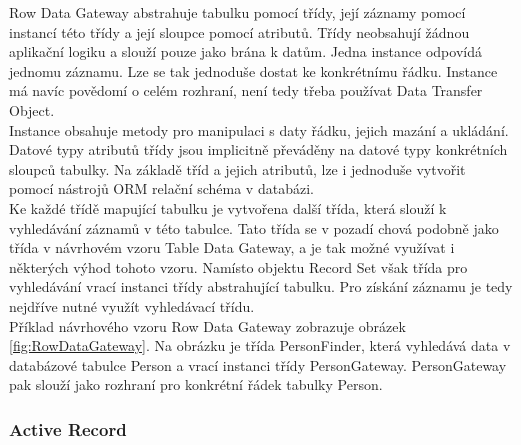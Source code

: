 \documentclass[ing,male,java,dept456]{diploma}						%
\begin{document}
Row Data Gateway abstrahuje tabulku pomocí třídy, její záznamy pomocí instancí této třídy a její sloupce pomocí atributů. Třídy neobsahují žádnou aplikační logiku a slouží pouze jako brána k datům. Jedna instance odpovídá jednomu záznamu. Lze se tak jednoduše dostat ke konkrétnímu řádku. Instance má navíc povědomí o celém rozhraní, není tedy třeba používat Data Transfer Object. \\
Instance obsahuje metody pro manipulaci s daty řádku, jejich mazání a ukládání. Datové typy atributů třídy jsou implicitně převáděny na datové typy konkrétních sloupců tabulky. Na základě tříd a jejich atributů, lze i jednoduše vytvořit pomocí nástrojů ORM relační schéma v databázi. \\
Ke každé třídě mapující tabulku je vytvořena další třída, která slouží k vyhledávání záznamů v této tabulce. Tato třída se v pozadí chová podobně jako třída v návrhovém vzoru Table Data Gateway, a je tak možné využívat i některých výhod tohoto vzoru. Namísto objektu Record Set však třída pro vyhledávání vrací instanci třídy abstrahující tabulku. Pro získání záznamu je tedy nejdříve nutné využít vyhledávací třídu. \\
Příklad návrhového vzoru Row Data Gateway zobrazuje obrázek \ref{fig:RowDataGateway}. Na obrázku je třída PersonFinder, která vyhledává data v databázové tabulce Person a vrací instanci třídy PersonGateway. PersonGateway pak slouží jako rozhraní pro konkrétní řádek tabulky Person. \\


\subsubsection{Active Record}
\label{subsubsec:ActiveRecord}
\end{document}
